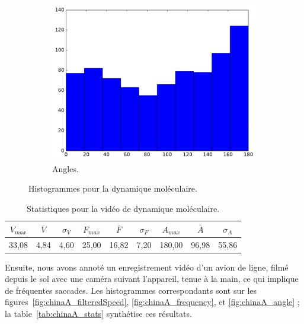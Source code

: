 \begin{figure}[!htbp]
		~
		\begin{subfigure}[t]{\subImgWclicks}
			\centering
			\includegraphics[width=\textwidth]{figures/ch3/atom_angle}
			\caption{Angles.}
			\label{fig:atom_angle}
		\end{subfigure}
		\caption[Histogrammes pour la dynamique moléculaire]{Histogrammes pour la dynamique moléculaire.}
		\label{fig:histAtoms}
	\end{figure}

\begin{table}
	\centering
	\begin{tabular}{c c c c c c c c c}
		$V_{max}$	& $\overline{V}$	& $\sigma_{V}$	& $F_{max}$	& $\overline{F}$	& $\sigma_{F}$	& $A_{max}$	& $\overline{A}$	& $\sigma_{A}$	\bigstrut[b] \\ \hline

		33,08		& 4,84				& 4,60			& 25,00		& 16,82				& 7,20			& 180,00	& 96,98				& 55,86			\bigstrut[t] \\
	\end{tabular}
	\caption[Statistiques pour la vidéo de dynamique moléculaire]{Statistiques pour la vidéo de dynamique moléculaire.}
	\label{tab:atom_stats}
\end{table}	

	Ensuite, nous avons annoté un enregistrement vidéo d'un avion de ligne, filmé depuis le sol avec une caméra suivant l'appareil, tenue à la main, ce qui implique de fréquentes saccades. Les histogrammes correspondants sont sur les figures~\ref{fig:chinaA_filteredSpeed}, \ref{fig:chinaA_frequency}, et \ref{fig:chinaA_angle} ; la table~\ref{tab:chinaA_stats} synthétise ces résultats.

